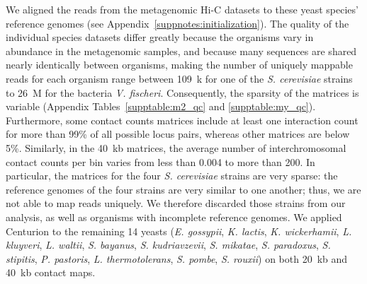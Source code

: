 We aligned the reads from the metagenomic Hi-C datasets to these yeast
species' reference genomes (see Appendix~\ref{suppnotes:initialization}). The
quality of the individual species datasets differ greatly because the
organisms vary in abundance in the metagenomic samples, and because many
sequences are shared nearly identically between organisms, making the number
of uniquely mappable reads for each organism range between 109~k for one of
the \textit{S. cerevisiae} strains to 26~M for the bacteria \textit{V.
fischeri}. Consequently, the sparsity of the matrices is variable (Appendix
Tables~\ref{supptable:m2_qc} and \ref{supptable:my_qc}). Furthermore,
some contact counts matrices include at least
one interaction count for more than 99\% of all possible locus pairs, whereas
other matrices are below 5\%. Similarly, in the 40~kb matrices, the average
number of interchromosomal contact counts per bin varies from less than 0.004
to more than 200. In particular, the matrices for the four \textit{S.
cerevisiae} strains are very sparse: the reference genomes of the four strains
are very similar to one another; thus, we are not able to map reads uniquely.
We therefore discarded those strains from our analysis, as well as organisms
with incomplete reference genomes. We applied Centurion to the remaining 14
yeasts (\textit{E. gossypii}, \textit{K. lactis}, \textit{K. wickerhamii},
\textit{L. kluyveri}, \textit{L. waltii}, \textit{S. bayanus}, \textit{S.
kudriavzevii}, \textit{S. mikatae}, \textit{S. paradoxus}, \textit{S.
stipitis}, \textit{P. pastoris}, \textit{L. thermotolerans}, \textit{S.
pombe}, \textit{S. rouxii}) on both 20~kb and 40~kb contact maps.

